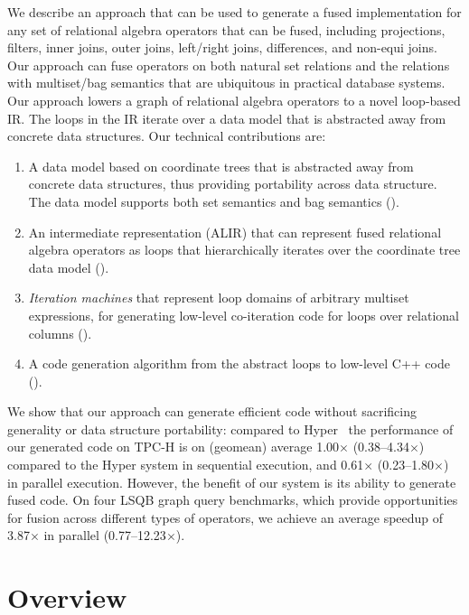 \documentclass[acmsmall,screen,nonacm]{acmart}\settopmatter{printfolios=true,printccs=false,printacmref=false}
\begin{document}
We describe an approach that can be used to generate a fused implementation for any set of relational algebra operators that can be fused, including projections, filters, inner joins, outer joins, left/right joins, differences, and non-equi joins. Our approach can fuse operators on both natural set relations and the relations with multiset/bag semantics that are ubiquitous in practical database systems. Our approach lowers a graph of relational algebra operators to a novel loop-based IR. The loops in the IR iterate over a data model that is abstracted away from concrete data structures. Our technical contributions are:
\begin{enumerate}
    \item A data model based on coordinate trees that is abstracted away from concrete data structures, thus providing portability across data structure. The data model supports both set semantics and bag semantics ().
    \item An intermediate representation (ALIR) that can represent fused relational algebra operators as loops that hierarchically iterates over the coordinate tree data model (). 
    \item \emph{Iteration machines} that represent loop domains of arbitrary multiset expressions, for generating low-level co-iteration code for loops over relational columns ().
    \item A code generation algorithm from the abstract loops to low-level C++ code ().
\end{enumerate}
We show that our approach can generate efficient code without sacrificing generality or data structure portability: compared to Hyper~\cite{hyper} the performance of our generated code on TPC-H is on (geomean) average 1.00$\times$ (0.38--4.34$\times$) compared to the Hyper system in sequential execution, and 0.61$\times$ (0.23--1.80$\times$) in parallel execution. However, the benefit of our system is its ability to generate fused code. On four LSQB graph query benchmarks, which provide opportunities for fusion across different types of operators, we achieve an average speedup of 3.87$\times$ in parallel (0.77--12.23$\times$).



\section{Overview}
\label{sec:overview}
\end{document}
